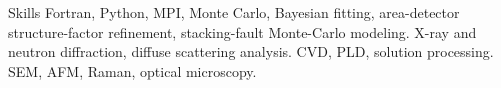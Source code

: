 
\begin{rubric}{Skills}
    Fortran, Python, MPI, Monte Carlo, Bayesian fitting, area-detector structure-factor refinement, stacking-fault Monte-Carlo modeling.
    X-ray and neutron diffraction, diffuse scattering analysis.
    CVD, PLD, solution processing.
    SEM, AFM, Raman, optical microscopy.
\end{rubric}
